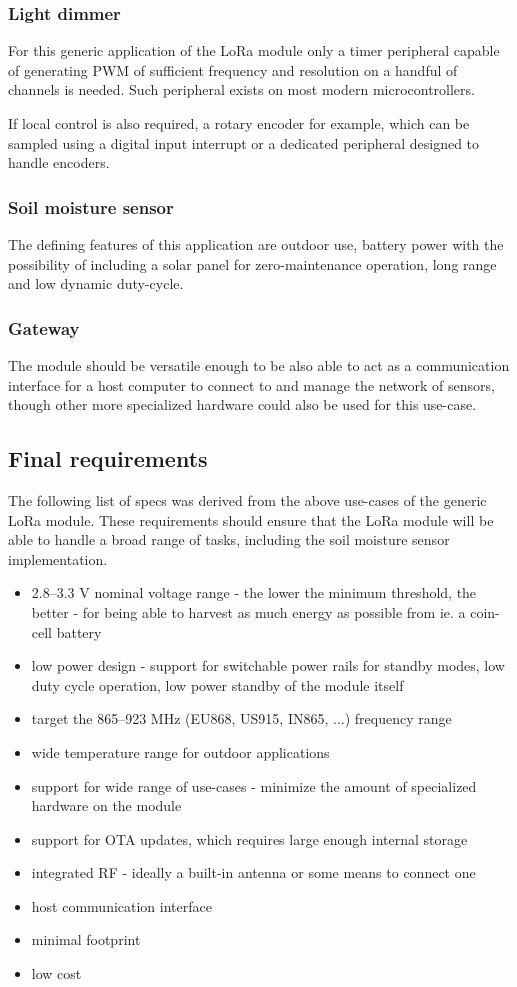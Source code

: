 \subsubsection{Light dimmer}
For this generic application of the LoRa module only a timer peripheral capable of generating PWM of sufficient frequency and resolution on a handful of channels is needed. Such peripheral exists on most modern microcontrollers.

If local control is also required, a rotary encoder for example, which can be sampled using a digital input interrupt or a dedicated peripheral designed to handle encoders.

\subsubsection{Soil moisture sensor}
The defining features of this application are outdoor use, battery power with the possibility of including a solar panel for zero-maintenance operation, long range and low dynamic duty-cycle.

\subsubsection{Gateway}
The module should be versatile enough to be also able to act as a communication interface for a host computer to connect to and manage the network of sensors, though other more specialized hardware could also be used for this use-case.

\subsection{\label{section:final-requirements}Final requirements}
The following list of specs was derived from the above use-cases of the generic LoRa module. These requirements should ensure that the LoRa module will be able to handle a broad range of tasks, including the soil moisture sensor implementation.
\begin{itemize}
    \item 2.8--3.3 V nominal voltage range - the lower the minimum threshold, the better - for being able to harvest as much energy as possible from ie. a coin-cell battery
    \item low power design - support for switchable power rails for standby modes, low duty cycle operation, low power standby of the module itself
    \item target the 865--923 MHz (EU868, US915, IN865, ...) frequency range
    \item wide temperature range for outdoor applications
    \item support for wide range of use-cases - minimize the amount of specialized hardware on the module
    \item support for OTA updates, which requires large enough internal storage
    \item integrated RF - ideally a built-in antenna or some means to connect one
    \item host communication interface
    \item minimal footprint
    \item low cost
\end{itemize}

